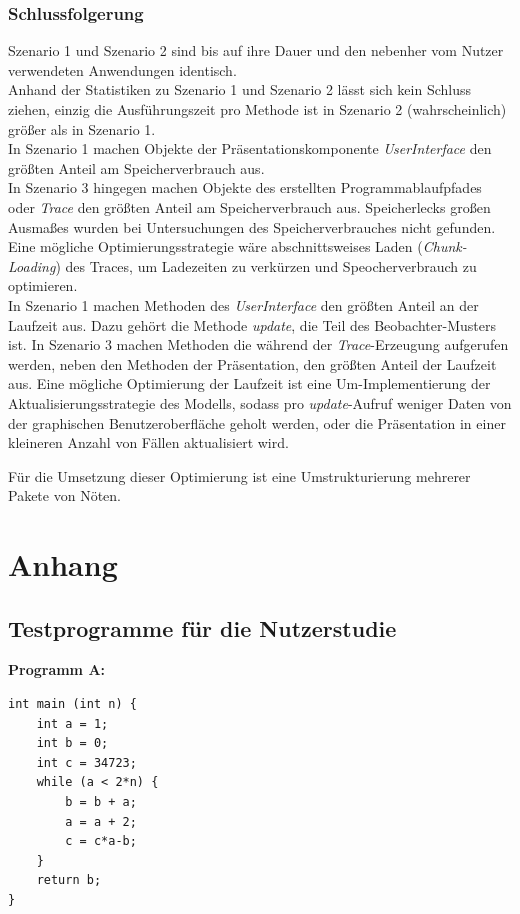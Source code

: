 \documentclass[parskip=full]{scrartcl}
\begin{document}
    \subsubsection{Schlussfolgerung}
        Szenario 1 und Szenario 2 sind bis auf ihre Dauer und den nebenher vom Nutzer verwendeten Anwendungen identisch. \\
        Anhand der Statistiken zu Szenario 1 und Szenario 2 lässt sich kein Schluss ziehen, einzig die Ausführungszeit pro Methode ist in Szenario 2 (wahrscheinlich) größer als in Szenario 1.\\
        
        In Szenario 1 machen Objekte der Präsentationskomponente \textit{UserInterface} den größten Anteil am Speicherverbrauch aus. \\
        In Szenario 3 hingegen machen Objekte des erstellten Programmablaufpfades oder \textit{Trace} den größten Anteil am Speicherverbrauch aus.
        Speicherlecks großen Ausmaßes wurden bei Untersuchungen des Speicherverbrauches nicht gefunden.
        Eine mögliche Optimierungsstrategie wäre abschnittsweises Laden (\textit{Chunk-Loading}) des Traces, um Ladezeiten zu verkürzen und Speocherverbrauch zu optimieren. \\
        In Szenario 1 machen Methoden des \textit{UserInterface} den größten Anteil an der Laufzeit aus.
        Dazu gehört die Methode \textit{update}, die Teil des Beobachter-Musters ist.
        In Szenario 3 machen Methoden die während der \textit{Trace}-Erzeugung aufgerufen werden, neben den Methoden der Präsentation, den größten Anteil der Laufzeit aus.
        Eine mögliche Optimierung der Laufzeit ist eine Um-Implementierung der Aktualisierungsstrategie des Modells, sodass pro \textit{update}-Aufruf weniger Daten von der graphischen Benutzeroberfläche geholt werden, oder die Präsentation in einer kleineren Anzahl von Fällen aktualisiert wird.

        Für die Umsetzung dieser Optimierung ist eine Umstrukturierung mehrerer Pakete von Nöten.

\newpage

\section{Anhang}
\subsection{Testprogramme für die Nutzerstudie}\label{code}
\textbf{Programm A:}
\begin{verbatim}
int main (int n) {
	int a = 1;
	int b = 0;
	int c = 34723;
	while (a < 2*n) {
		b = b + a;
		a = a + 2;
		c = c*a-b;
	}
	return b;
}
\end{verbatim}
\end{document}
